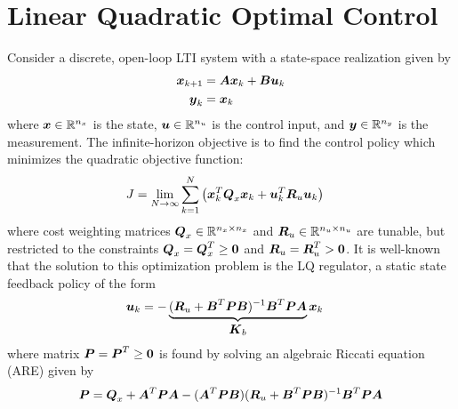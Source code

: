\section{Linear Quadratic Optimal Control}
Consider a discrete, open-loop LTI system with a state-space realization given by
\begin{equation}
\begin{aligned}
	\vb*{x}_{k+1} &= \vb*{A} \vb*{x}_{k} + \vb*{B} \vb*{u}_{k}\\
	\vb*{y}_{k} &= \vb*{x}_{k}
\end{aligned} \label{eq-linear-state-dynamics}
\end{equation}
where $\vb*{x} \in \mathbb{R}^{n_{x}}$ is the state, $\vb*{u} \in \mathbb{R}^{n_{u}}$ is the control input, and $\vb*{y} \in \mathbb{R}^{n_{y}}$ is the measurement.  The infinite-horizon objective is to find the control policy which minimizes the quadratic objective function:
\begin{equation}
\begin{aligned}
	J &= \lim_{N \to \infty} \sum_{k = 1}^{N} \big{(} \vb*{x}_{k}^{T} \vb*{Q}_{x} \vb*{x}_{k} + \vb*{u}_{k}^{T} \vb*{R}_{u} \vb*{u}_{k} \big{)}
\end{aligned} \label{eq-optimal-cost-function}
\end{equation}
where cost weighting matrices $\vb*{Q}_{x} \in \mathbb{R}^{n_{x} \times n_{x}}$ and $\vb*{R}_{u} \in \mathbb{R}^{n_{u} \times n_{u}}$ are tunable, but restricted to the constraints $\vb*{Q}_{x} = \vb*{Q}_{x}^{T} \geq \vb*{0}$ and $\vb*{R}_{u} = \vb*{R}_{u}^{T} > \vb*{0}$.  It is well-known that the solution to this optimization problem is the LQ regulator, a static state feedback policy of the form
\begin{equation}
\begin{aligned}
	\vb*{u}_{k} &= -\underbrace{
		(\vb*{R}_{u} + \vb*{B}^{T}\vb*{P}\vb*{B})^{-1}\vb*{B}^{T}\vb*{P}\vb*{A}
	}_{\text{\normalsize $\vb*{K}_{b}$}}
	\vb*{x}_{k}
\end{aligned} \label{eq-static-lqr-control}
\end{equation}
where matrix $\vb*{P} = \vb*{P}^{T} \ge \vb*{0}$ is found by solving an algebraic Riccati equation (ARE) given by
\begin{equation}
\begin{aligned}
	\vb*{P} &= \vb*{Q}_{x} + \vb*{A}^{T}\vb*{P}\vb*{A} - (\vb*{A}^{T}\vb*{P}\vb*{B})(\vb*{R}_{u}
		 + \vb*{B}^{T}\vb*{P}\vb*{B})^{-1}\vb*{B}^{T}\vb*{P}\vb*{A}\\
\end{aligned} \label{eq-lqr-dare}
\end{equation}


